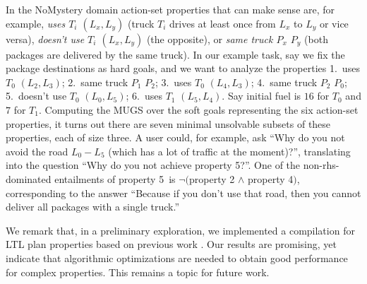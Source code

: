 In the NoMystery domain action-set properties that can make sense are,
for example, \emph{uses $T_i$ $(L_x,L_y)$} (truck $T_i$ drives at
least once from $L_x$ to $L_y$ or vice versa), \emph{doesn't use $T_i$
  $(L_x,L_y)$} (the opposite), or \emph{same truck $P_x$ $P_y$} (both
packages are delivered by the same truck). In our example task, say we
fix the package destinations as hard goals, and we want to analyze the
properties 1.\ uses $T_0$ $(L_2,L_3)$; 2.\ same truck $P_1$ $P_2$;
3.\ uses $T_0$ $(L_4,L_3)$; 4.\ same truck $P_2$ $P_0$; 5.\ doesn't
use $T_0$ $(L_0,L_5)$; 6.\ uses $T_1$ $(L_5,L_4)$. Say initial fuel is
$16$ for $T_0$ and $7$ for $T_1$. Computing the MUGS over the soft
goals representing the six action-set properties, it turns out there
are seven minimal unsolvable subsets of these properties, each of size
three. A user could, for example, ask ``Why do you not avoid the road
$L_0-L_5$ (which has a lot of traffic at the moment)?'', translating
into the question ``Why do you not achieve property 5?''. 
%
One of the non-rhs-dominated entailments of property 5\ is
$\neg($property 2 $\wedge$ property 4$)$, corresponding to the answer
``Because if you don't use that road, then you cannot deliver all
packages with a single truck.''

%
%

We remark that, in a preliminary exploration, we implemented a
compilation for LTL plan properties based on previous work
\cite{edelkamp:icaps-06,baier:etal:ai-09}. Our results are promising,
yet indicate that algorithmic optimizations are needed to obtain good
performance for complex properties. This remains a topic for future
work.





